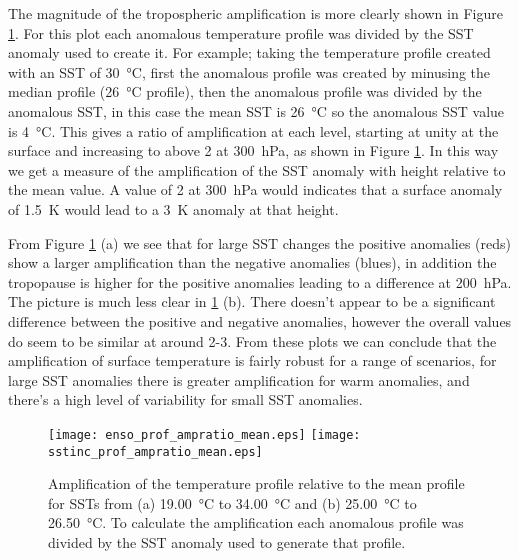 The magnitude of the tropospheric amplification is more clearly shown in Figure 
\ref{fig:scmsstamp}. For this plot each anomalous temperature profile was 
divided by the SST anomaly used to create it. For example; taking the 
temperature profile created with an SST of \SI{30}{\degreeCelsius}, first the 
anomalous profile was created by minusing the median profile 
(\SI{26}{\degreeCelsius} profile), then the anomalous profile was divided by the 
anomalous SST, in this case the mean SST is \SI{26}{\celsius} so the anomalous 
SST value is \SI{4}{\celsius}.  This gives a ratio of amplification at each 
level, starting at unity at the surface and increasing to above 2 at 
\SI{300}{\hecto\pascal}, as shown in Figure \ref{fig:scmsstamp}.  In this way we 
get a measure of the amplification of the SST anomaly with height relative to 
the mean value.  A value of 2 at \SI{300}{\hecto\pascal} would indicates that a 
surface anomaly of \SI{1.5}{\kelvin} would lead to a \SI{3}{\kelvin} anomaly at 
that height.  

From Figure \ref{fig:scmsstamp} (a) we see that for large SST changes the 
positive anomalies (reds) show a larger amplification than the negative 
anomalies (blues), in addition the tropopause is higher for the positive 
anomalies leading to a difference at \SI{200}{\hecto\pascal}. The picture is 
much less clear in \ref{fig:scmsstamp} (b). There doesn't appear to be a 
significant difference between the positive and negative anomalies, however the 
overall values do seem to be similar at around 2-3. From these plots we can 
conclude that the amplification of surface temperature is fairly robust for a 
range of scenarios, for large SST anomalies there is greater amplification for 
warm anomalies, and there's a high level of variability for small SST anomalies.

\begin{figure}[ht]
\texttt{[image: enso\_prof\_ampratio\_mean.eps]}
\texttt{[image: sstinc\_prof\_ampratio\_mean.eps]}\\
\caption{Amplification of the temperature profile relative to the mean profile 
	for SSTs from (a) \SI{19.00}{\degreeCelsius} to \SI{34.00}{\degreeCelsius} 
and (b) \SI{25.00}{\degreeCelsius} to \SI{26.50}{\degreeCelsius}. To calculate 
the amplification each anomalous profile was divided by the SST anomaly used to 
generate that profile.}
\label{fig:scmsstamp}
\end{figure}

